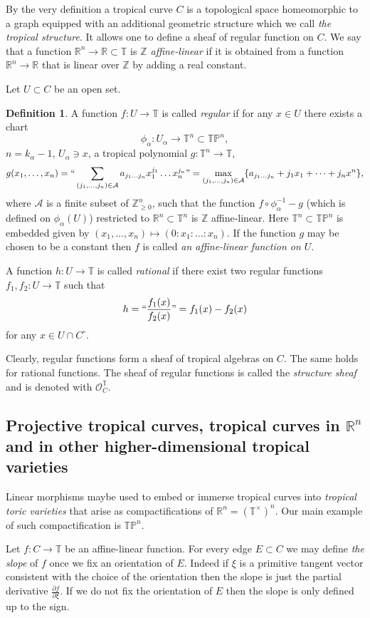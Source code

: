 \documentclass[12pt]{amsart}
\theoremstyle{plain}
\theoremstyle{definition}
\newtheorem{definition}[theorem]{Definition}
\theoremstyle{remark}
\newcommand{\Z}{\mathbb Z}    %
\newcommand{\R}{\mathbb R}    %
\newcommand{\PP}{\mathbb P}   %
\newcommand{\T}{\mathbb T}    %
\renewcommand{\O}{\mathcal O}   %
\newcommand{\<}{\langle}   %
\renewcommand{\>}{\rangle} %
\newcommand{\dd}{\partial}
\begin{document}
By the very definition
a tropical curve $C$ is a topological space homeomorphic to a graph
equipped with an additional geometric structure which we call
{\em the tropical structure}.
It allows one to define a sheaf of regular function on $C$.
We say that a function $\R^n\to\R\subset\T$ is {\em $\Z$ affine-linear}
if it is obtained from a function $\R^n\to\R$ that is linear over $\Z$
by adding a real constant.

Let $U\subset C$ be an open set.
\begin{definition} A function $f:U\to\T$ is called {\em regular}
if for any $x\in U$ there exists a chart
$$\phi_\alpha:U_\alpha\to\T^n\subset\T\PP^n,$$
$n=k_\alpha-1$, $U_\alpha\ni x$, a tropical polynomial
$g:\T^n\to\T$,
$$g(x_1,\dots,x_n)=
``\sum_{(j_1,\dots,j_n)\in \mathcal A} a_{j_1\dots j_n}x_1^{j_1}\dots x_n^{j_n}"=
\max\limits_{(j_1,\dots,j_n)\in \mathcal A} \{a_{j_1\dots j_n}+j_1 x_1+\dots+ j_n x^n\},$$
where $\mathcal A$ is a finite subset of $\Z^n_{\geq 0}$,
such that the function
$f\circ\phi^{-1}_\alpha - g$ (which is defined on $\phi_\alpha(U)$)
restricted to $\R^n\subset\T^n$ is $\Z$ affine-linear.
Here $\T^n\subset\T\PP^n$ is embedded given by
$(x_1,\dots,x_n)\mapsto (0:x_1:\dots:x_n)$.
If the function $g$ may be chosen to be a constant then
$f$ is called {\em an affine-linear function on $U$}.

A function $h:U\to \T$ is called {\em rational} if there exist two
regular functions $f_1,f_2:U\to \T$ such that
$$h=``\frac{f_1(x)}{f_2(x)}"=f_1(x)-f_2(x)$$
for any $x\in U\cap C^\circ$.
\end{definition}

Clearly, regular functions form a sheaf of tropical algebras on $C$.
The same holds for rational functions.
The sheaf of regular functions is called the {\em structure sheaf}
and is denoted with $\O^{\T}_C$.


\subsection{Projective tropical curves, tropical curves in $\R^n$
and in other higher-dimensional tropical varieties}
Linear morphisms maybe used to embed or immerse
tropical curves into {\em tropical toric varieties}
that arise as compactifications of $\R^n=(\T^{\times})^n$.
Our main example of such compactification is $\T\PP^n$.

Let $f:C\to\T$ be an affine-linear function.
For every edge $E\subset C$ we may define {\em the slope}
of $f$ once we fix an orientation of $E$. Indeed if $\xi$
is a primitive tangent vector consistent with the choice
of the orientation then the slope is just the partial
derivative $\frac{\dd f}{\dd\xi}$. If we do not fix the
orientation of $E$ then the slope is only defined up to
the sign.
\end{document}
